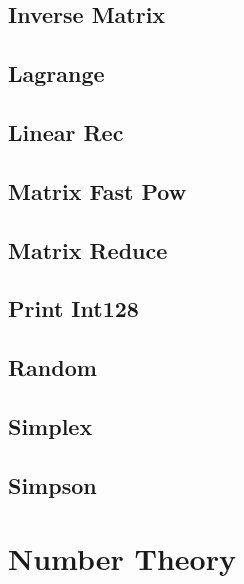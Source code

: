 \documentclass[9pt,portrait,twocolumn,a4paper,notitlepage]{article}
\newcommand\cppfile[2][]{%
\ifstrempty{#1}{}{}%
}
\begin{document}
\subsection{Inverse Matrix}
\cppfile{math_clean/inverse_matrix.cpp}

\subsection{Lagrange}
\cppfile{math_clean/lagrange.cpp}

\subsection{Linear Rec}
\cppfile{math_clean/linear_rec.cpp}

\subsection{Matrix Fast Pow}
\cppfile{math_clean/matrix_fast_pow.cpp}

\subsection{Matrix Reduce}
\cppfile{math_clean/matrix_reduce.cpp}

\subsection{Print Int128}
\cppfile{math_clean/print_int128.cpp}

\subsection{Random}
\cppfile{math_clean/random.cpp}

\subsection{Simplex}
\cppfile{math_clean/simplex.cpp}

\subsection{Simpson}
\cppfile{math_clean/simpson.cpp}


\section{Number Theory}
\end{document}
